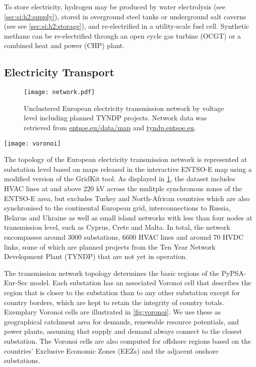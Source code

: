 To store electricity, hydrogen may be produced by water electrolysis (see
\cref{sec:si:h2:supply}), stored in overground steel tanks or underground salt
caverns (see see \cref{sec:si:h2:storage}), and re-electrified in a
utility-scale fuel cell. Synthetic methane can be re-electrified through an open
cycle gas turbine (OCGT) or a combined heat and power (CHP) plant.

\subsection{Electricity Transport}
\label{sec:si:electricity:transport}

\begin{figure}
    \texttt{[image: network.pdf]}
    \caption{Unclustered European electricity transmission network by voltage level including planned TYNDP projects. Network data was retrieved from \href{https://www.entsoe.eu/data/map/}{entsoe.eu/data/map} and \href{https://tyndp.entsoe.eu/}{tyndp.entsoe.eu}.}
    \label{fig:base-network}
\end{figure}

\begin{SCfigure}
    \caption{Exemplary Voronoi cells of the transmission network's substations.}
    \texttt{[image: voronoi]}
    \label{fig:voronoi}
\end{SCfigure}


The topology of the European electricity transmission network is represented at
substation level based on maps released in the interactive \mbox{ENTSO-E} map
using a modified version of the GridKit tool. As displayed in
\cref{fig:base-network}, the dataset includes HVAC lines at and above 220 kV
across the mulitple synchronous zones of the \mbox{ENTSO-E} area, but excludes Turkey
and North-African countries which are also synchronised to the continental
European grid, interconnections to Russia, Belarus and Ukraine as well as small
island networks with less than four nodes at transmission level, such as Cyprus,
Crete and Malta. In total, the network encompasses around 3000 substations, 6600
HVAC lines and around 70 HVDC links, some of which are planned projects from the
Ten Year Network Development Plant (TYNDP) that are not yet in operation.


The transmission network topology determines the basic regions of the
PyPSA-Eur-Sec model. Each substation has an associated Voronoi cell that
describes the region that is closer to the substation than to any other
substation except for country borders, which are kept to retain the integrity of
country totals. Exemplary Voronoi cells are illustrated in \cref{fig:voronoi}.
We use these as geographical catchment area for demands, renewable resource
potentials, and power plants, assuming that supply and demand always connect to
the closest substation. The Voronoi cells are also computed for offshore regions
based on the countries' Exclusive Economic Zones (EEZs) and the adjacent onshore
substations.

